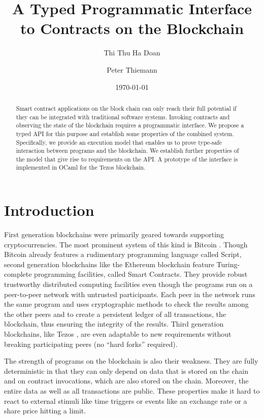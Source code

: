 \documentclass[a4paper]{llncs}
\title{A Typed Programmatic Interface to Contracts on the Blockchain}
\author{Thi Thu Ha Doan\and
Peter Thiemann\orcidID{0000-0002-9000-1239}}
\institute{University of Freiburg, Germany\\
\email{\{doanha,thiemann\}@informatik.uni-freiburg.de}
}
\date{\today}
\begin{document}
\maketitle
\pagestyle{plain}
\begin{abstract}
  Smart contract applications on the block chain can only reach their full potential if
  they can be integrated with traditional software systems. Invoking
  contracts and observing the state of the blockchain requires a
  programmatic interface. We propose a typed API for this
  purpose and establish some properties of the combined
  system. Specifically, we provide an execution model that
  enables us to prove type-safe interaction between programs and the 
  blockchain. We establish further properties of the model that
  give rise to requirements on the API. A prototype of the interface
  is implemented in OCaml for the Tezos blockchain.
\end{abstract}

\section{Introduction}
\label{sec:introduction}


First generation blockchains were primarily geared towards supporting
cryptocurrencies. The most prominent system of this kind is Bitcoin
\cite{bitcoin-whitepaper}. Though Bitcoin already features a
rudimentary programming language called Script, second generation
blockchains like the Ethereum blockchain \cite{eth-whitepaper} feature
Turing-complete programming facilities, called 
Smart Contracts. They provide robust trustworthy distributed computing
facilities even though the programs run on a peer-to-peer network with
untrusted participants. Each peer in the network runs the same program
and uses cryptographic methods to check the results among the other
peers and to create a persistent ledger of all transactions, the
blockchain, thus ensuring the integrity of the results. Third
generation blockchains, like Tezos \cite{tezos-whitepaper}, are even adaptable to
new requirements without breaking participating peers (no ``hard
forks'' required).

The strength of programs on the blockchain is also their
weakness. They are fully deterministic in that they can only depend on
data that is stored on the chain and on contract invocations, which are
also stored on the chain. Moreover, the entire data as well as all
transactions are public. These properties make it hard to react to
external stimuli like time triggers or events like an exchange rate or
a share price hitting a limit. 
\end{document}
